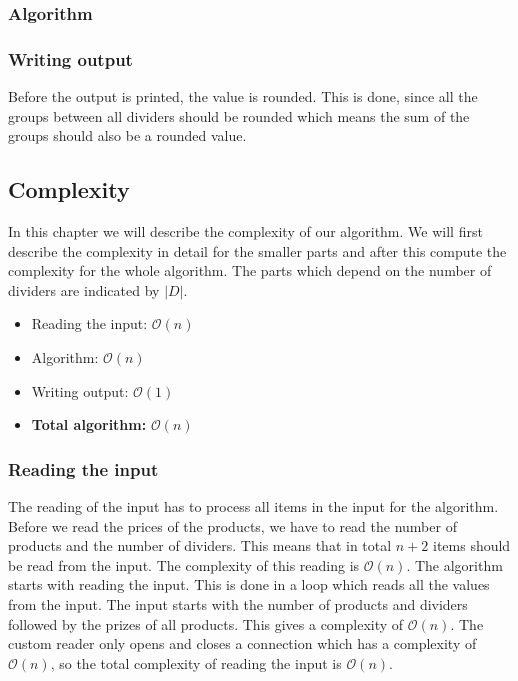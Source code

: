 \documentclass{article}
\newcommand{\bigO}[1]{\mathcal{O}(#1)}
\begin{document}
\subsubsection{Algorithm}

\subsubsection{Writing output}
Before the output is printed, the value is rounded. This is done, since all the groups between all dividers should be rounded which means the sum of the groups should also be a rounded value.

\subsection{Complexity}
In this chapter we will describe the complexity of our algorithm. We will first describe the complexity in detail for the smaller parts and after this compute the complexity for the whole algorithm. The parts which depend on the number of dividers are indicated by $|D|$.

\begin{itemize}
  \item Reading the input: $\bigO{n}$
  \item Algorithm: $\bigO{n}$
  \item Writing output: $\bigO{1}$
  \item \textbf{Total algorithm:} $\bigO{n}$
\end{itemize}

\subsubsection{Reading the input}
The reading of the input has to process all items in the input for the algorithm. Before we read the prices of the products, we have to read the number of products and the number of dividers. This means that in total $n + 2$ items should be read from the input. The complexity of this reading is $\bigO{n}$.
\newline
\newline
The algorithm starts with reading the input. This is done in a loop which reads all the values from the input. The input starts with the number of products and dividers followed by the prizes of all products. This gives a complexity of $\bigO{n}$. The custom reader only opens and closes a connection which has a complexity of $\bigO{n}$, so the total complexity of reading the input is $\bigO{n}$.
\end{document}
